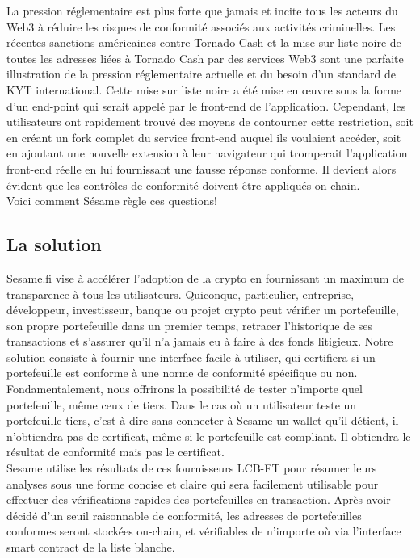 ﻿\documentclass[a4paper]{article}
\begin{document}
La pression réglementaire est plus forte que jamais et incite tous les acteurs du Web3 à réduire les risques de conformité associés aux activités criminelles. Les récentes sanctions américaines contre Tornado Cash et la mise sur liste noire de toutes les adresses liées à Tornado Cash par des services Web3 sont une parfaite illustration de la pression réglementaire actuelle et du besoin d'un standard de KYT international. Cette mise sur liste noire a été mise en œuvre sous la forme d'un end-point qui serait appelé par le front-end de l'application. Cependant, les utilisateurs ont rapidement trouvé des moyens de contourner cette restriction, soit en créant un fork complet du service front-end auquel ils voulaient accéder, soit en ajoutant une nouvelle extension à leur navigateur qui tromperait l'application front-end réelle en lui fournissant une fausse réponse conforme. Il devient alors évident que les contrôles de conformité doivent être appliqués on-chain. \\

Voici comment Sésame règle ces questions! 
\subsection{La solution}
Sesame.fi vise à accélérer l’adoption de la crypto en fournissant un maximum de transparence à tous les utilisateurs. Quiconque, particulier, entreprise, développeur, investisseur, banque ou projet crypto peut vérifier un portefeuille, son propre portefeuille dans un premier temps, retracer l’historique de ses transactions et s’assurer qu’il n’a jamais eu à faire à des fonds litigieux. Notre solution consiste à fournir une interface facile à utiliser, qui certifiera si un portefeuille est conforme à une norme de conformité spécifique ou non. \\

Fondamentalement, nous offrirons la possibilité de tester n'importe quel portefeuille, même ceux de tiers. Dans le cas où un utilisateur teste un portefeuille tiers, c'est-à-dire sans connecter  à Sesame un wallet qu’il détient, il n’obtiendra pas de certificat, même si le portefeuille est compliant. Il obtiendra le résultat de conformité mais pas le certificat. \\

Sesame utilise les résultats de ces fournisseurs LCB-FT pour résumer leurs analyses sous une forme concise et claire qui sera facilement utilisable pour effectuer des vérifications rapides des portefeuilles en transaction. Après avoir décidé d'un seuil raisonnable de conformité, les adresses de portefeuilles conformes seront stockées on-chain, et vérifiables de n'importe où via l'interface smart contract de la liste blanche. \\
\end{document}
